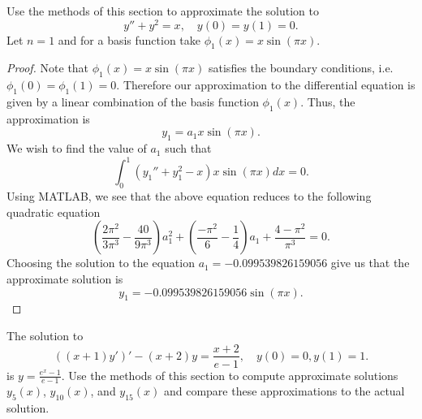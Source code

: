 \documentclass[12pt]{article}
\theoremstyle{definition}
\newenvironment{custompbm}[1]
  {\renewcommand\theproblem{#1}\problem}
  {\endproblem}
\begin{document}
\begin{custompbm}{3}
  Use the methods of this section to approximate the solution to
  \[
    y'' + y^2 = x,\quad y(0) = y(1) = 0.
  \]
  Let $n=1$ and for a basis function take $\phi_1(x) = x\sin(\pi x)$.
\end{custompbm}

\begin{proof}
  Note that $\phi_1(x) = x\sin(\pi x)$ satisfies the boundary conditions, i.e.\
  $\phi_1(0) = \phi_1(1) = 0$. Therefore our approximation to the differential equation is
  given by a linear combination of the basis function $\phi_1(x)$. Thus, the approximation
  is
  \[
    y_1 = a_1 x\sin(\pi x).
  \]
  We wish to find the value of $a_1$ such that
  \[
    \int_0^1 \left(y_1'' + y_1^2 - x\right)x\sin(\pi x) dx = 0.
  \]
  Using MATLAB, we see that the above equation reduces to the following quadratic equation
  \[
    \left(\frac{2\pi^2}{3\pi^3} - \frac{40}{9\pi^3}\right)a_1^2 + \left(\frac{-\pi^2}{6} - \frac{1}{4}\right)a_1 + \frac{4 - \pi^2}{\pi^3} = 0.
  \]
  Choosing the solution to the equation $a_1 = -0.099539826159056$ give us that
  the approximate solution is
  \[
    y_1 = -0.099539826159056 \sin(\pi x).
  \]
\end{proof}


\begin{custompbm}{5}
  The solution to
  \[
    ((x+1)y')' - (x+2)y = \frac{x+2}{e-1},\quad y(0)= 0, y(1) = 1.
  \]
  is $y=\frac{e^x - 1}{e - 1}$. Use the methods of this section to compute
  approximate solutions $y_5(x)$, $y_{10}(x)$, and $y_{15}(x)$ and compare these
  approximations to the actual solution.
\end{custompbm}
\end{document}

